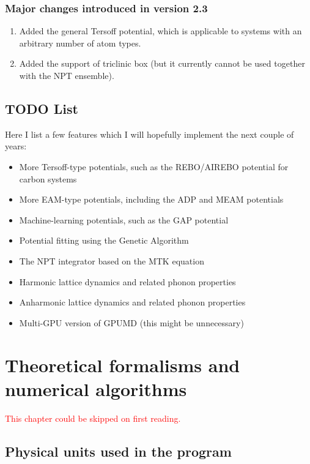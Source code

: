 \documentclass[12pt,a4paper]{report}
\begin{document}
\subsection{Major changes introduced in version 2.3}
\begin{enumerate}
    \item Added the general Tersoff potential, which is applicable to systems with an arbitrary number of atom types.
    \item Added the support of triclinic box (but it currently cannot be used together with the NPT ensemble).
\end{enumerate}

\section{TODO List}

Here I list a few features which I will hopefully implement the next couple of years:
\begin{itemize}
\item More Tersoff-type potentials, such as the REBO/AIREBO potential for carbon systems
\item More EAM-type potentials, including the ADP and MEAM potentials
\item Machine-learning potentials, such as the GAP potential
\item Potential fitting using the Genetic Algorithm
\item The NPT integrator based on the MTK equation
\item Harmonic lattice dynamics and related phonon properties
\item Anharmonic lattice dynamics and related phonon properties
\item Multi-GPU version of GPUMD (this might be unnecessary)
\end{itemize}


\chapter{Theoretical formalisms and numerical algorithms\label{chapter:theory}}

\textcolor{red}{This chapter could be skipped on first reading.}

\section{Physical units used in the program}
\end{document}
